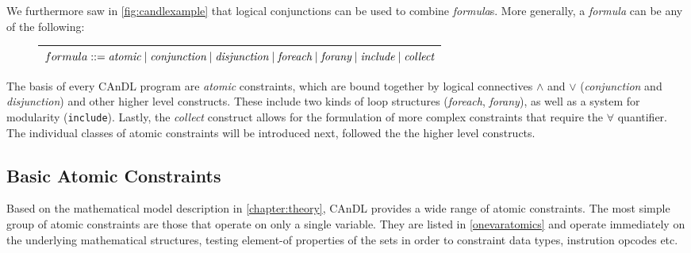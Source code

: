     \noindent
    We furthermore saw in \autoref{fig:candlexample} that logical conjunctions
    can be used to combine {\it formula}s.
    More generally, a {\it formula} can be any of the following:
\begin{figure}[H]
\centering
\begin{tabular}{|c|}
    \hline
    $formula ::= \text{\it atomic}\mid\text{\it conjunction}\mid\text{\it disjunction}\mid\text{\it foreach}\mid \text{\it forany}\mid\text{\it include}\mid\text{\it collect}$\\
    \hline
\end{tabular}
\end{figure}

    \noindent
    The basis of every CAnDL program are {\it atomic} constraints, which are
    bound together by logical connectives $\land$ and $\lor$
    ({\it conjunction} and {\it disjunction}) and other higher level constructs.
    These include two kinds of loop structures ({\it foreach}, {\it forany}), as
    well as a system for modularity (\texttt{include}).
    Lastly, the {\it collect} construct allows for the formulation of more
    complex constraints that require the $\forall$ quantifier.
    The individual classes of atomic constraints will be introduced next,
    followed the the higher level constructs.

\subsection{Basic Atomic Constraints}

    Based on the mathematical model description in \autoref{chapter:theory},
    CAnDL provides a wide range of atomic constraints.
    The most simple group of atomic constraints are those that operate on only
    a single variable.
    They are listed in \autoref{onevaratomics} and operate immediately on the
    underlying mathematical structures, testing element-of properties of the
    sets in order to constraint data types, instrution opcodes etc.

